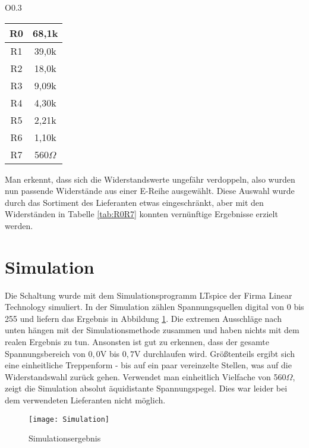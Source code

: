 \begin{wraptable}{O}{0.3\columnwidth}
\begin{centering}
\caption{R0-R7}
\label{tab:R0R7}
\begin{tabular}{|c|c|}
\hline
R0 & 68,1k\\
\hline
R1 & 39,0k\\
\hline
R2 & 18,0k\\
\hline
R3 & 9,09k\\
\hline
R4 & 4,30k\\
\hline
R5 & 2,21k\\
\hline
R6 & 1,10k\\
\hline
R7 & 560$\Omega$\\
\hline
\end{tabular}
\par %
\end{centering}
\end{wraptable}

Man erkennt, dass sich die Widerstandswerte ungefähr verdoppeln, also wurden nun passende Widerstände aus einer E-Reihe ausgewählt. Diese Auswahl wurde durch das Sortiment des Lieferanten etwas eingeschränkt, aber mit den Widerständen in Tabelle \ref{tab:R0R7} konnten vernünftige Ergebnisse erzielt werden.


\FloatBarrier

\section{Simulation}
Die Schaltung wurde mit dem Simulationsprogramm LTspice der Firma Linear Technology simuliert. In der Simulation zählen Spannungsquellen digital von 0 bis 255 und liefern das Ergebnis in Abbildung \ref{fig:Simu}. Die extremen Ausschläge nach unten hängen mit der Simulationsmethode zusammen und haben nichts mit dem realen Ergebnis zu tun. Ansonsten ist gut zu erkennen, dass der gesamte Spannungsbereich von $0{,}0$V bis $0{,}7$V durchlaufen wird. Größtenteils ergibt sich eine einheitliche Treppenform - bis auf ein paar vereinzelte Stellen, was auf die Widerstandswahl zurück gehen. Verwendet man einheitlich Vielfache von 560$\Omega$, zeigt die Simulation absolut äquidistante Spannungspegel. Dies war leider bei dem verwendeten Lieferanten nicht möglich. 

\begin{figure}[h!]
\centering
\texttt{[image: Simulation]} %
\caption{Simulationsergebnis}
\label{fig:Simu}
\end{figure}
\FloatBarrier

